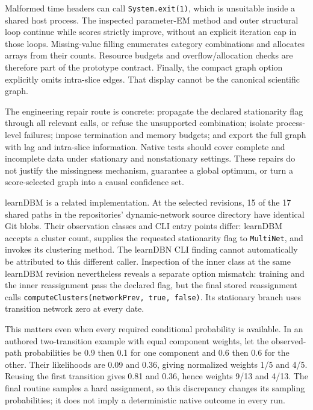 Malformed time headers can call \texttt{System.exit(1)}, which is unsuitable
inside a shared host process. The inspected parameter-EM method and outer
structural loop continue while scores strictly improve, without an explicit
iteration cap in those loops. Missing-value filling enumerates category
combinations and allocates arrays from their counts. Resource budgets and
overflow/allocation checks are therefore part of the prototype contract.
Finally, the compact graph option explicitly omits intra-slice edges. That
display cannot be the canonical scientific graph.~\citep{exec15_javatemporal_learndbn}

The engineering repair route is concrete: propagate the declared stationarity
flag through all relevant calls, or refuse the unsupported combination;
isolate process-level failures; impose termination and memory budgets; and
export the full graph with lag and intra-slice information. Native tests
should cover complete and incomplete data under stationary and nonstationary
settings. These repairs do not justify the missingness mechanism, guarantee
a global optimum, or turn a score-selected graph into a causal confidence
set.~\citep{exec15_javatemporal_design}

learnDBM is a related implementation. At the selected revisions, 15 of the
17 shared paths in the repositories' dynamic-network source directory have
identical Git blobs. Their observation classes and CLI entry points differ:
learnDBM accepts a cluster count, supplies the requested stationarity flag
to \texttt{MultiNet}, and invokes its clustering method. The learnDBN CLI
finding cannot automatically be attributed to this different caller.
Inspection of the inner class at the same learnDBM revision nevertheless
reveals a separate option mismatch: training and the inner reassignment
pass the declared flag, but the final stored reassignment calls
\texttt{computeClusters(networkPrev, true, false)}. Its stationary branch
uses transition network zero at every date.
\citep{exec15_javatemporal_learndbn,exec15_javatemporal_learndbm,rel15multinet}

This matters even when every required conditional probability is available.
In an authored two-transition example with equal component weights, let
the observed-path probabilities be 0.9 then 0.1 for one component and 0.6
then 0.6 for the other. Their likelihoods are 0.09 and 0.36, giving
normalized weights 1/5 and 4/5. Reusing the first transition gives 0.81
and 0.36, hence weights 9/13 and 4/13. The final routine samples a hard
assignment, so this discrepancy changes its sampling probabilities; it
does not imply a deterministic native outcome in every run.
\citep{rel15multinet,rel15delegatewitnesses}

